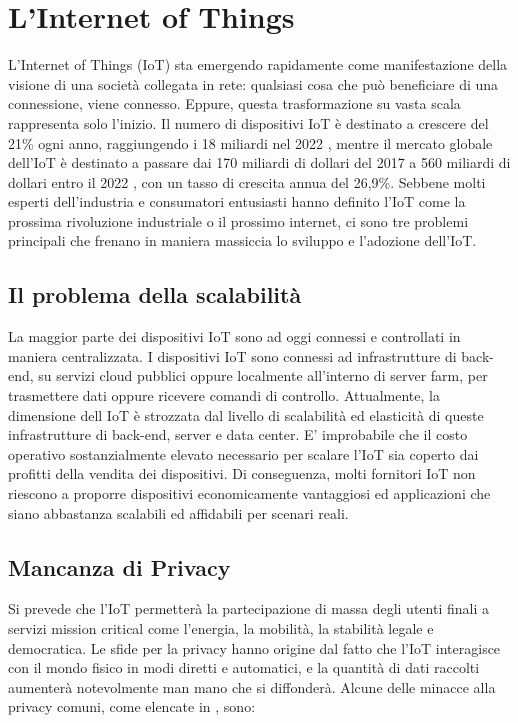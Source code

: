 \section{L'Internet of Things}
L'Internet of Things (IoT) sta emergendo rapidamente come manifestazione della visione di una società collegata in rete: qualsiasi cosa che può beneficiare di una connessione, viene connesso. Eppure, questa trasformazione su vasta scala rappresenta solo l'inizio. Il numero di dispositivi IoT è destinato a crescere del 21\% ogni anno, raggiungendo i 18 miliardi nel 2022 \cite{c10}, mentre il mercato globale dell'IoT è destinato a passare dai 170 miliardi di dollari del 2017 a 560 miliardi di dollari entro il 2022 \cite{c15}, con un tasso di crescita annua del 26,9\%. Sebbene molti esperti dell'industria e consumatori entusiasti hanno definito l'IoT come la prossima rivoluzione industriale o il prossimo internet, ci sono tre problemi principali che frenano in maniera massiccia lo sviluppo e l'adozione dell'IoT.

\subsection{Il problema della scalabilità}
La maggior parte dei dispositivi IoT sono ad oggi connessi e controllati in maniera centralizzata. I dispositivi IoT sono connessi ad infrastrutture di back-end, su servizi cloud pubblici oppure localmente all'interno di server farm, per trasmettere dati oppure ricevere comandi di controllo.
Attualmente, la dimensione dell IoT è strozzata dal livello di scalabilità ed elasticità di queste infrastrutture di back-end, server e data center. E' improbabile che il costo operativo sostanzialmente elevato necessario per scalare l'IoT sia coperto dai profitti della vendita dei dispositivi. Di conseguenza, molti fornitori IoT non riescono a proporre dispositivi economicamente vantaggiosi ed applicazioni che siano abbastanza scalabili ed affidabili per scenari reali.

\subsection{Mancanza di Privacy}
Si prevede che l'IoT permetterà la partecipazione di massa degli utenti finali a servizi mission critical come l'energia, la  mobilità, la stabilità legale e democratica. Le sfide per la privacy hanno origine dal fatto che l'IoT interagisce con il mondo fisico in modi diretti e automatici, e la quantità di dati raccolti aumenterà notevolmente man mano che si diffonderà. Alcune  delle minacce alla privacy comuni, come elencate in \cite{c37}, sono:

